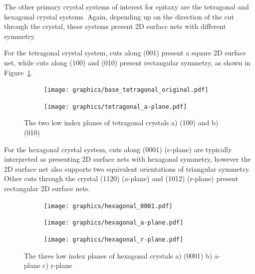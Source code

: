 \documentclass[final,5p,times,twocolumn]{elsarticle}
\begin{document}
The other primary crystal systems of interest for epitaxy are the tetragonal and hexagonal crystal systems. Again, depending up on the direction of the cut through the crystal, these systems present 2D surface nets with different symmetry.

For the tetragonal crystal system, cuts along (001) present a square 2D surface net, while cuts along (100) and (010) present rectangular symmetry, as shown in Figure~\ref{fig:tetra_planes}.
\begin{figure}
    \centering
    \begin{subfigure}{0.3\textwidth}
        \texttt{[image: graphics/base\_tetragonal\_original.pdf]}
    \end{subfigure}\qquad
    \begin{subfigure}{0.3\textwidth}
        \texttt{[image: graphics/tetragonal\_a-plane.pdf]}
    \end{subfigure}
    \caption{The two low index planes of tetragonal crystals a) (100) and b) (010) \label{fig:tetra_planes}}
\end{figure}

For the hexagonal crystal system, cuts along (0001) (c-plane) are typically interpreted as presenting 2D surface nets with hexagonal symmetry, however the 2D surface net also supports two equivalent orientations of triangular symmetry\cite{Neretina2009b}. Other cuts through the crystal (1120) (a-plane) and (1012) (r-plane) present rectangular 2D surface nets.
\begin{figure}
        \centering
        \begin{subfigure}{0.3\textwidth}
            \texttt{[image: graphics/hexagonal\_0001.pdf]}
        \end{subfigure}\quad
        \begin{subfigure}{0.3\textwidth}
            \texttt{[image: graphics/hexagonal\_a-plane.pdf]}
        \end{subfigure}\quad
        \begin{subfigure}{0.3\textwidth}
            \texttt{[image: graphics/hexagonal\_r-plane.pdf]}
        \end{subfigure}
    \caption{The three low index planes of hexagonal crystals a) (0001) b) a-plane c) r-plane \label{fig:hex_planes}}
\end{figure}
\end{document}
